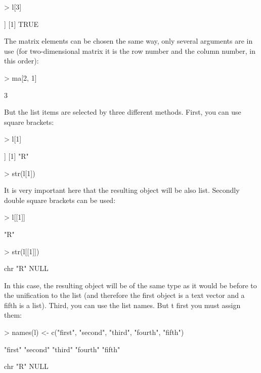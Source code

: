 \documentclass[a4paper,11pt]{scrartcl}
\begin{document}
\begin{Schunk}
\begin{Sinput}
> l[3]
\end{Sinput}
\begin{Soutput}
[[1]]
[1] TRUE
\end{Soutput}
\end{Schunk}
The matrix elements can be chosen the same way, only several arguments are in use (for two-dimensional matrix it is the row number and the column number, in this order):
\begin{Schunk}
\begin{Sinput}
> ma[2, 1]
\end{Sinput}
\begin{Soutput}
[1] 3
\end{Soutput}
\end{Schunk}
But the list items are selected by three different methods. First, you can use square brackets:
\begin{Schunk}
\begin{Sinput}
> l[1]
\end{Sinput}
\begin{Soutput}
[[1]]
[1] "R"
\end{Soutput}
\begin{Sinput}
> str(l[1])
\end{Sinput}
\end{Schunk}
It is very important here that the resulting object will be also list. Secondly double square brackets can be used:
\begin{Schunk}
\begin{Sinput}
> l[[1]]
\end{Sinput}
\begin{Soutput}
[1] "R"
\end{Soutput}
\begin{Sinput}
> str(l[[1]])
\end{Sinput}
\begin{Soutput}
 chr "R"
NULL
\end{Soutput}
\end{Schunk}

In this case, the resulting object will be of the same type as it would be before to the unification to the list (and therefore the first object is a text vector and a fifth is a list). Third, you can use the list names. But t first you must assign them:
\begin{Schunk}
\begin{Sinput}
> names(l) <- c("first", "second", "third", "fourth", "fifth")
\end{Sinput}
\begin{Soutput}
[1] "first"  "second" "third"  "fourth" "fifth" 
\end{Soutput}
\begin{Soutput}
 chr "R"
NULL
\end{Soutput}
\end{Schunk}
\end{document}
